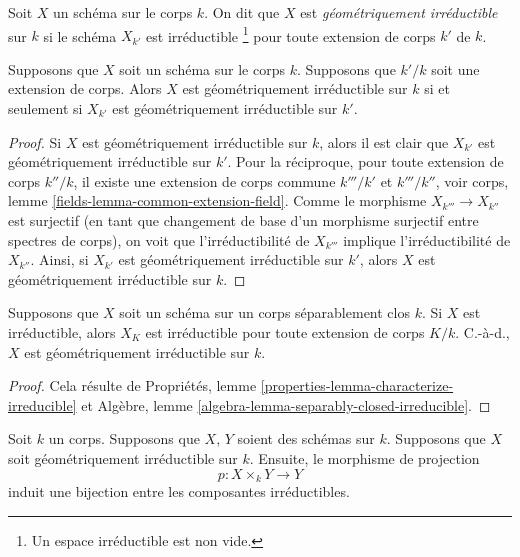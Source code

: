 \begin{definition}
\label{definition-geometrically-irreducible}
Soit $X$ un schéma sur le corps $k$. On dit que
$X$ est {\it géométriquement irréductible} sur $k$ si le
schéma $X_{k'}$ est irréductible \footnote { Un espace
irréductible est non vide. } pour toute extension de corps $k'$ de $k$.
\end{definition}

\begin{lemma}
\label{lemma-geometrically-irreducible-check-after-extension}
Supposons que $X$ soit un schéma sur le corps $k$.
Supposons que $k'/k$ soit une extension de corps. Alors
$X$ est géométriquement irréductible sur $k$ si et
seulement si $X_{k'}$ est géométriquement irréductible sur $k'$.
\end{lemma}

\begin{proof}
Si $X$ est géométriquement irréductible sur $k$, alors il est
clair que $X_{k'}$ est géométriquement irréductible sur $k'$.
Pour la réciproque, pour toute extension de corps $k''/k$, il
existe une extension de corps commune $k'''/k'$ et $k'''/k''$,
voir corps, lemme \ref{fields-lemma-common-extension-field}. Comme
le morphisme $X_{k'''} \to X_{k''}$ est surjectif (en tant que
changement de base d'un morphisme surjectif entre spectres de
corps), on voit que l'irréductibilité de $X_{k'''}$ implique
l'irréductibilité de $X_{k''}$. Ainsi, si $X_{k'}$ est géométriquement
irréductible sur $k'$, alors $X$ est géométriquement irréductible sur $k$.
\end{proof}

\begin{lemma}
\label{lemma-separably-closed-irreducible}
Supposons que $X$ soit un schéma sur un corps
séparablement clos $k$. Si $X$ est irréductible, alors
$X_K$ est irréductible pour toute extension de corps
$K/k$. C.-à-d., $X$ est géométriquement irréductible sur $k$.
\end{lemma}

\begin{proof}
Cela résulte de Propriétés, lemme
\ref{properties-lemma-characterize-irreducible} et Algèbre, lemme \ref{algebra-lemma-separably-closed-irreducible}.
\end{proof}

\begin{lemma}
\label{lemma-bijection-irreducible-components}
Soit $k$ un corps. Supposons
que $X$, $Y$ soient des schémas sur $k$.
Supposons que $X$ soit géométriquement
irréductible sur $k$. Ensuite, le morphisme de projection
$$
p : X \times_k Y \longrightarrow Y
$$
induit une bijection entre les composantes irréductibles.
\end{lemma}

